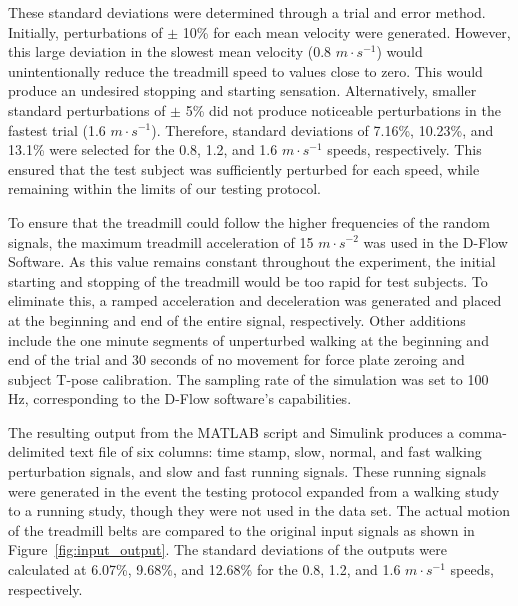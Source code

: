 \documentclass[10pt,a4paper,twocolumn]{article}
\begin{document}
These standard deviations were determined through a trial and error method.
Initially, perturbations of $\pm$ 10\% for each mean velocity were generated.
However, this large deviation in the slowest mean velocity (0.8 $m \cdot
s^{-1}$) would unintentionally reduce the treadmill speed to values close to
zero. This would produce an undesired stopping and starting sensation.
Alternatively, smaller standard perturbations of $\pm$ 5\% did not produce
noticeable perturbations in the fastest trial (1.6 $m \cdot s^{-1}$).
Therefore, standard deviations of 7.16\%, 10.23\%, and 13.1\% were selected for
the 0.8, 1.2, and 1.6 $m \cdot s^{-1}$ speeds, respectively.  This ensured that
the test subject was sufficiently perturbed for each speed, while remaining
within the limits of our testing protocol.

To ensure that the treadmill could follow the higher frequencies of the random
signals, the maximum treadmill acceleration of 15 $m \cdot s^{-2}$ was used in
the D-Flow Software. As this value remains constant throughout the experiment,
the initial starting and stopping of the treadmill would be too rapid for test
subjects. To eliminate this, a ramped acceleration and deceleration was
generated and placed at the beginning and end of the entire signal,
respectively. Other additions include the one minute segments of unperturbed
walking at the beginning and end of the trial and 30 seconds of no movement for
force plate zeroing and subject T-pose calibration.  The sampling rate of the
simulation was set to 100 Hz, corresponding to the D-Flow software's
capabilities.

The resulting output from the MATLAB script and Simulink produces a comma-
delimited text file of six columns: time stamp, slow, normal, and fast walking
perturbation signals, and slow and fast running signals.  These running signals
were generated in the event the testing protocol expanded from a walking study
to a running study, though they were not used in the data set.  The actual
motion of the treadmill belts are compared to the original input signals as
shown in Figure~\ref{fig:input_output}.   The standard deviations of the
outputs were calculated at 6.07\%, 9.68\%, and 12.68\% for the 0.8, 1.2,
and 1.6 $m \cdot s^{-1}$ speeds, respectively.
\end{document}

